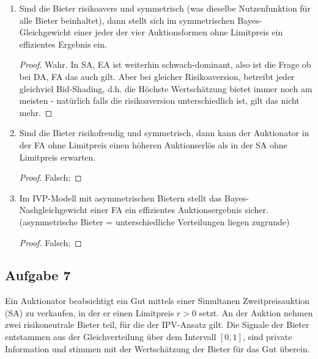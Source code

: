 \documentclass[12pt]{extreport} %
\theoremstyle{named}
\theoremstyle{itshape}
\theoremstyle{normal}
\begin{document}
\begin{enumerate}
		\begin{proof}
			Falsch;
		\end{proof}
	\item Sind die Bieter risikoavers und symmetrisch (was dieselbe Nutzenfunktion für alle Bieter beinhaltet), dann stellt sich im symmetrischen Bayes-Gleichgewicht einer jeder der vier Auktionsformen ohne Limitpreis ein effizientes Ergebnis ein.
		\begin{proof}
			 Wahr. In SA, EA ist weiterhin schwach-dominant, also ist die Frage ob bei DA, FA das auch gilt. Aber bei gleicher Risikoaversion, betreibt jeder gleichviel Bid-Shading, d.h. die Höchste Wertschätzung bietet immer noch am meisten - natürlich falls die risikoaversion unterschiedlich ist, gilt das nicht mehr.
		\end{proof}
	\item Sind die Bieter risikofreudig und symmetrisch, dann kann der Auktionator in der FA ohne Limitpreis einen höheren Auktionserlös als in der SA ohne Limitpreis erwarten.
		\begin{proof}
			Falsch; 
		\end{proof}
	\item Im IVP-Modell mit asymmetrischen Bietern stellt das Bayes-Nashgleichgewicht einer FA ein effizientes Auktionsergebnis sicher. (asymmetrische Bieter = unterschiedliche Verteilungen liegen zugrunde)
		\begin{proof}
			Falsch;
		\end{proof}
\end{enumerate}

\subsection*{Aufgabe 7}

Ein Auktionator beabsichtigt ein Gut mittels einer Simultanen Zweitpreisauktion (SA) zu verkaufen, in der er einen Limitpreis $r > 0$ setzt. An der Auktion nehmen zwei risikoneutrale Bieter teil, für die der IPV-Ansatz gilt. Die Signale der Bieter entstammen aus der Gleichverteilung über dem Intervall $[0, 1]$, sind private Information und stimmen mit der Wertschätzung der Bieter für das Gut überein.
\end{document}

